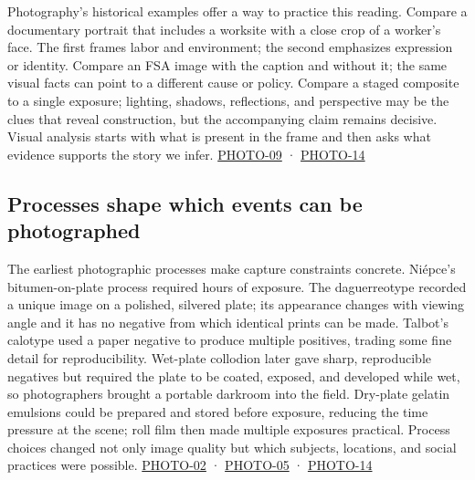 Photography's historical examples offer a way to practice this reading. Compare a documentary portrait that includes a worksite with a close crop of a worker's face. The first frames labor and environment; the second emphasizes expression or identity. Compare an FSA image with the caption and without it; the same visual facts can point to a different cause or policy. Compare a staged composite to a single exposure; lighting, shadows, reflections, and perspective may be the clues that reveal construction, but the accompanying claim remains decisive. Visual analysis starts with what is present in the frame and then asks what evidence supports the story we infer. \hyperref[04-visual-computing-ii-ch036-photo-09---photography-session-09]{PHOTO-09} · \hyperref[04-visual-computing-ii-ch036-photo-14---photography-session-14]{PHOTO-14}

\subsection{Processes shape which events can be photographed}\label{04-visual-computing-ii-ch034-processes-shape-which-events-can-be-photographed}

The earliest photographic processes make capture constraints concrete. Niépce's bitumen-on-plate process required hours of exposure. The daguerreotype recorded a unique image on a polished, silvered plate; its appearance changes with viewing angle and it has no negative from which identical prints can be made. Talbot's calotype used a paper negative to produce multiple positives, trading some fine detail for reproducibility. Wet-plate collodion later gave sharp, reproducible negatives but required the plate to be coated, exposed, and developed while wet, so photographers brought a portable darkroom into the field. Dry-plate gelatin emulsions could be prepared and stored before exposure, reducing the time pressure at the scene; roll film then made multiple exposures practical. Process choices changed not only image quality but which subjects, locations, and social practices were possible. \hyperref[04-visual-computing-ii-ch036-photo-02---photography-session-02]{PHOTO-02} · \hyperref[04-visual-computing-ii-ch036-photo-05---photography-session-05]{PHOTO-05} · \hyperref[04-visual-computing-ii-ch036-photo-14---photography-session-14]{PHOTO-14}

